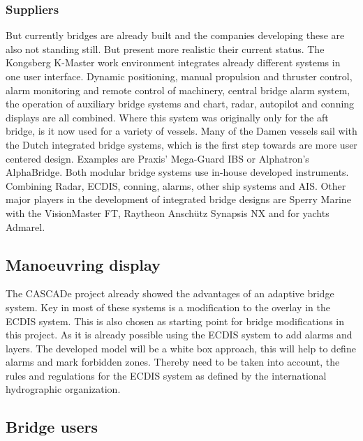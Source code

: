 
\subsubsection{Suppliers}
But currently bridges are already built and the companies developing these are also not standing still. But present more realistic their current status. The Kongsberg K-Master work environment integrates already different systems in one user interface. Dynamic positioning, manual propulsion and thruster control, alarm monitoring and remote control of machinery, central bridge alarm system, the operation of auxiliary bridge systems and chart, radar, autopilot and conning displays are all combined. Where this system was originally only for the aft bridge, is it now used for a variety of vessels. \cite{Kongsberg2017}
Many of the Damen vessels sail with the Dutch integrated bridge systems, which is the first step towards are more user centered design. Examples are Praxis' Mega-Guard IBS or Alphatron's AlphaBridge. Both modular bridge systems use in-house developed instruments. Combining Radar, \ac{ECDIS}, conning, alarms, other ship systems and \ac{AIS}. 
Other major players in the development of integrated bridge designs are Sperry Marine with the VisionMaster FT, Raytheon Anschütz Synapsis NX and for yachts Admarel.\\


\subsection{Manoeuvring display}
The CASCADe project already showed the advantages of an adaptive bridge system. Key in most of these systems is a modification to the overlay in the \ac{ECDIS} system. This is also chosen as starting point for bridge modifications in this project. As it is already possible using the \ac{ECDIS} system to add alarms and layers. The developed model will be a white box approach, this will help to define alarms and mark forbidden zones. Thereby need to be taken into account, the rules and regulations for the \ac{ECDIS} system as defined by the international hydrographic organization.


\subsection{Bridge users}

